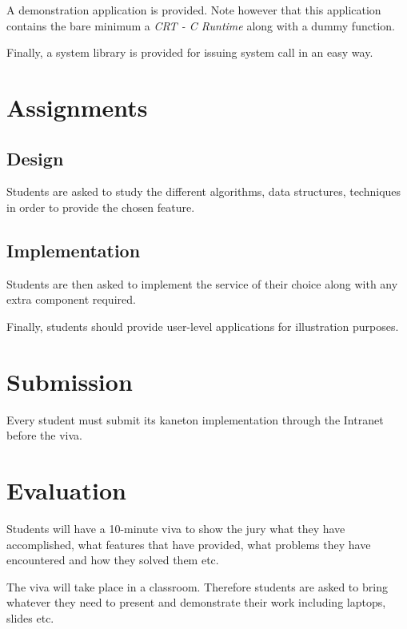 A demonstration application is provided. Note however that this application
contains the bare minimum \ie{} a \textit{CRT - C Runtime} along with a
dummy function.

Finally, a system library is provided for issuing system call in
an easy way.

%
%

\section{Assignments}


\subsection*{Design}

Students are asked to study the different algorithms, data structures,
techniques in order to provide the chosen feature.


\subsection*{Implementation}

Students are then asked to implement the service of their choice
along with any extra component required.

Finally, students should provide user-level applications for illustration
purposes.

%
%

\section{Submission}

Every student must submit its kaneton implementation through the Intranet
before the viva.

%
%

\section{Evaluation}

Students will have a 10-minute viva to show the jury what they have
accomplished, what features that have provided, what problems they
have encountered and how they solved them etc.

The viva will take place in a classroom. Therefore students are
asked to bring whatever they need to present and demonstrate
their work including laptops, slides etc.
